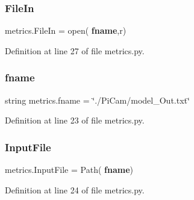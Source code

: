 \subsubsection{File\+In}
{\footnotesize\ttfamily metrics.\+File\+In = open(\textbf{ fname},\textquotesingle{}r\textquotesingle{})}



Definition at line 27 of file metrics.\+py.

\mbox{\label{namespacemetrics_abc168a1355b72795b77a73e5e60a71cc}} 
\subsubsection{fname}
{\footnotesize\ttfamily string metrics.\+fname = \char`\"{}./Pi\+Cam/model\+\_\+\+Out.\+txt\char`\"{}}



Definition at line 23 of file metrics.\+py.

\mbox{\label{namespacemetrics_aaa873a1396e30bad11ad61fd8df1ca5f}} 
\subsubsection{Input\+File}
{\footnotesize\ttfamily metrics.\+Input\+File = Path(\textbf{ fname})}



Definition at line 24 of file metrics.\+py.

